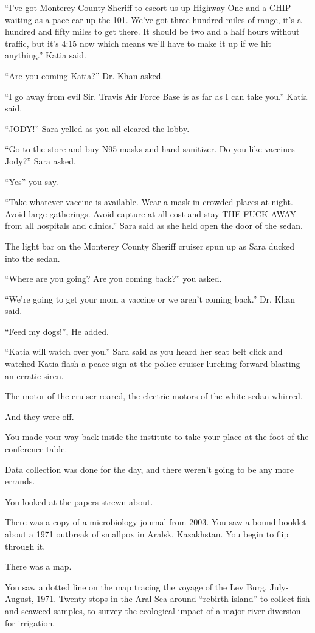 \documentclass[17pt, twoside, a5paper, openright, extrafontsizes]{memoir}
\begin{document}
``I've got Monterey County Sheriff to escort us up Highway One and a
CHIP waiting as a pace car up the 101. We've got three hundred miles of
range, it's a hundred and fifty miles to get there. It should be two and
a half hours without traffic, but it's 4:15 now which means we'll have
to make it up if we hit anything.'' Katia said.

``Are you coming Katia?'' Dr. Khan asked.

``I go away from evil Sir. Travis Air Force Base is as far as I can take
you.'' Katia said.

``JODY!'' Sara yelled as you all cleared the lobby.

``Go to the store and buy N95 masks and hand sanitizer. Do you like
vaccines Jody?'' Sara asked.

``Yes'' you say.

``Take whatever vaccine is available. Wear a mask in crowded places at
night. Avoid large gatherings. Avoid capture at all cost and stay THE
FUCK AWAY from all hospitals and clinics.'' Sara said as she held open
the door of the sedan.

The light bar on the Monterey County Sheriff cruiser spun up as Sara
ducked into the sedan.

``Where are you going? Are you coming back?'' you asked.

``We're going to get your mom a vaccine or we aren't coming back.''
Dr. Khan said.

``Feed my dogs!'', He added.

``Katia will watch over you.'' Sara said as you heard her seat belt
click and watched Katia flash a peace sign at the police cruiser
lurching forward blasting an erratic siren.

The motor of the cruiser roared, the electric motors of the white sedan
whirred.

And they were off.

You made your way back inside the institute to take your place at the
foot of the conference table.

Data collection was done for the day, and there weren't going to be any
more errands.

You looked at the papers strewn about.

There was a copy of a microbiology journal from 2003. You saw a bound
booklet about a 1971 outbreak of smallpox in Aralsk, Kazakhstan. You
begin to flip through it.

There was a map.

You saw a dotted line on the map tracing the voyage of the Lev Burg,
July-August, 1971. Twenty stops in the Aral Sea around ``rebirth
island'' to collect fish and seaweed samples, to survey the ecological
impact of a major river diversion for irrigation.
\end{document}
